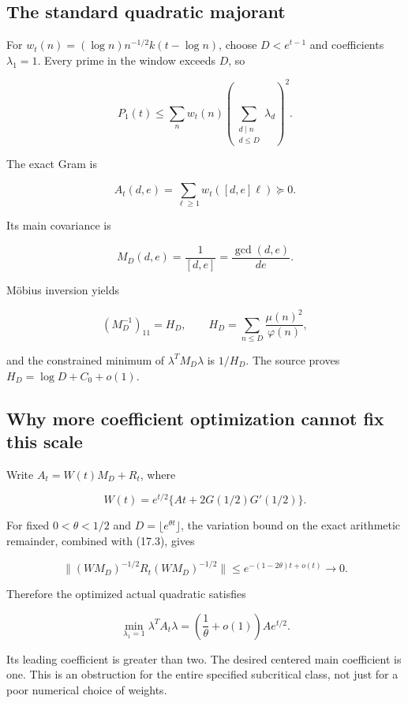 \documentclass[
  10pt,
  a4paper,
  10pt,
  oneside,
  openany]{book}
\begin{document}
\subsection{The standard quadratic
majorant}\label{the-standard-quadratic-majorant}

For \(w_t(n)=(\log n)n^{-1/2}k(t-\log n)\), choose \(D<e^{t-1}\) and
coefficients \(\lambda_1=1\). Every prime in the window exceeds \(D\),
so

\[
P_1(t)\le\sum_nw_t(n)
\left(\sum_{\substack{d\mid n\\d\le D}}\lambda_d\right)^2.
\tag{17.9}\label{eq:17.9}
\]

The exact Gram is

\[
A_t(d,e)=\sum_{\ell\ge1}w_t([d,e]\ell)\succeq0.
\tag{17.10}\label{eq:17.10}
\]

Its main covariance is

\[
M_D(d,e)=\frac1{[d,e]}=\frac{\gcd(d,e)}{de}.
\tag{17.11}\label{eq:17.11}
\]

Möbius inversion yields

\[
(M_D^{-1})_{11}=H_D,
\qquad H_D=\sum_{n\le D}\frac{\mu(n)^2}{\varphi(n)},
\tag{17.12}\label{eq:17.12}
\]

and the constrained minimum of \(\lambda^TM_D\lambda\) is \(1/H_D\). The
source proves \(H_D=\log D+C_0+o(1)\).

\subsection{Why more coefficient optimization cannot fix this
scale}\label{why-more-coefficient-optimization-cannot-fix-this-scale}

Write \(A_t=W(t)M_D+R_t\), where

\[
W(t)=e^{t/2}\{At+2G(1/2)G'(1/2)\}.
\tag{17.13}\label{eq:17.13}
\]

For fixed \(0<\theta<1/2\) and \(D=\lfloor e^{\theta t}\rfloor\), the
variation bound on the exact arithmetic remainder, combined with (17.3),
gives

\[
\|(WM_D)^{-1/2}R_t(WM_D)^{-1/2}\|
\le e^{-(1-2\theta)t+o(t)}\to0.
\tag{17.14}\label{eq:17.14}
\]

Therefore the optimized actual quadratic satisfies

\[
\min_{\lambda_1=1}\lambda^TA_t\lambda
=\left(\frac1\theta+o(1)\right)Ae^{t/2}.
\tag{17.15}\label{eq:17.15}
\]

Its leading coefficient is greater than two. The desired centered main
coefficient is one. This is an obstruction for the entire specified
subcritical class, not just for a poor numerical choice of weights.
\end{document}
